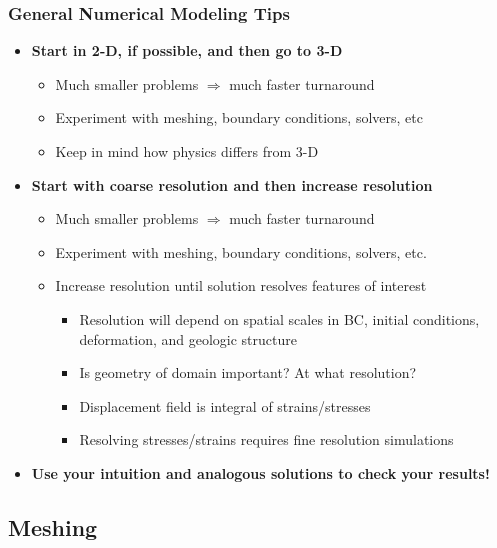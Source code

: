 \documentclass{beamer}
\newcommand{\important}[1]{{\bf\color{red}#1}}
\begin{document}
\begin{frame}
  \frametitle{General Numerical Modeling Tips}
 
  \begin{itemize}
  \item \important{Start in 2-D, if possible, and then go to 3-D}
    \begin{itemize}
    \item Much smaller problems $\Rightarrow$ much faster turnaround
    \item Experiment with meshing, boundary conditions, solvers, etc
    \item Keep in mind how physics differs from 3-D
    \end{itemize}
  \item \important{Start with coarse resolution and then increase resolution}
    \begin{itemize}
    \item Much smaller problems $\Rightarrow$ much faster turnaround
    \item Experiment with meshing, boundary conditions, solvers, etc.
    \item Increase resolution until solution resolves features of interest
      \begin{itemize}
      \item Resolution will depend on spatial scales in BC, initial
        conditions, deformation, and geologic structure
      \item Is geometry of domain important? At what resolution?
      \item Displacement field is integral of strains/stresses
      \item Resolving stresses/strains requires fine resolution simulations
      \end{itemize}
    \end{itemize}
  \item \important{Use your intuition and analogous solutions to check
      your results!}
  \end{itemize}

\end{frame}


\subsection{Meshing}
\end{document}
